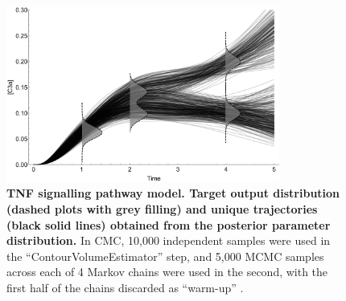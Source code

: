\begin{figure}[H]
	\centerline{\includegraphics[width=0.8\textwidth]{../figures/tnf_samples_vs_distribution.pdf}}
	\caption{\textbf{TNF signalling pathway model. Target output distribution (dashed plots with grey filling) and unique trajectories (black solid lines) obtained from the posterior parameter distribution.} In CMC, 10,000 independent samples were used in the ``ContourVolumeEstimator'' step, and 5,000 MCMC samples across each of 4 Markov chains were used in the second, with the first half of the chains discarded as ``warm-up'' \cite{lambert2018Student}.}
	\label{fig:tnf_samples_vs_distribution}
\end{figure}

